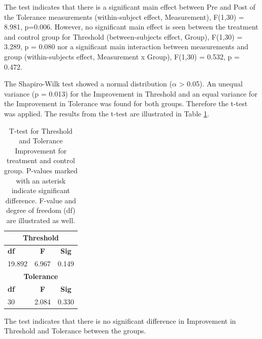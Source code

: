\noindent
The test indicates that there is a significant main effect between Pre and Post of the Tolerance measurements (within-subject effect, Measurement), F(1,30) = 8.981, p=0.006. However, no significant main effect is seen between the treatment and control group for Threshold (between-subjects effect, Group), F(1,30) = 3.289, p = 0.080 nor a significant main interaction between  measurements and group (within-subjects effect, Measurement x Group), F(1,30) = 0.532, p = 0.472.

The Shapiro-Wilk test showed a normal distribution ($\alpha$ > 0.05). An unequal variance (p = 0.013) for the Improvement in Threshold and an equal variance for the Improvement in Tolerance was found for both groups. Therefore the t-test was applied. The results from the t-test are illustrated in Table \ref{table:TTEST}. 

\begin{table}[ht]
\caption{T-test for Threshold and Tolerance Improvement for treatment and control group. P-values marked with an asterisk indicate significant difference. F-value and degree of
freedom (df) are illustrated as well.}
\centering
\begin{tabular}{l c c} 
\toprule
\multicolumn{3}{c}{\textbf{Threshold}} \\
\midrule  
\textbf{df} & \textbf{F} & \textbf{Sig} \\ [0.5ex] %
19.892 & 6.967 & 0.149    \\
\toprule
\multicolumn{3}{c}{\textbf{Tolerance}} \\
\midrule 
\textbf{df} & \textbf{F} & \textbf{Sig} \\ [0.5ex] %
30 & 2.084 & 0.330 \\
\hline
\end{tabular}
\label{table:TTEST}
\end{table}

\noindent
The test indicates that there is no significant difference in Improvement in Threshold and Tolerance between the groups.